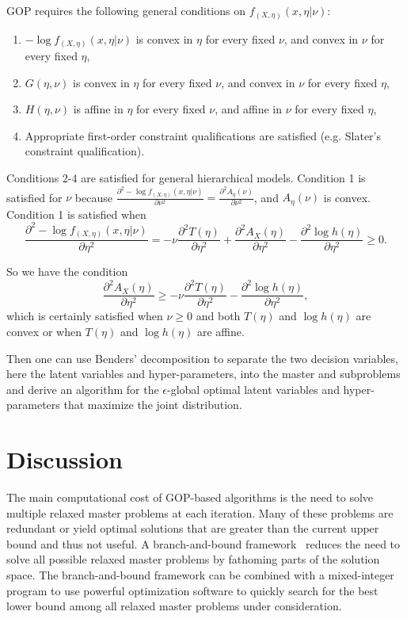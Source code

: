 \documentclass[11pt]{article}
\renewcommand{\geq}{\geqslant}
\begin{document}
GOP requires the following general conditions on $f_{(X,\eta)}(x, \eta | \nu)$:
\begin{enumerate}
	\item $-\log f_{(X,\eta)}(x, \eta | \nu)$ is convex in $\eta$ for every fixed $\nu$, and convex in $\nu$ for every fixed $\eta$,
	\item $G(\eta,\nu)$ is convex in $\eta$ for every fixed $\nu$, and convex in $\nu$ for every fixed $\eta$,
	\item $H(\eta, \nu)$ is affine in $\eta$ for every fixed $\nu$, and affine in $\nu$ for every fixed $\eta$,
	\item Appropriate first-order constraint qualifications are satisfied (e.g. Slater's constraint qualification).
\end{enumerate}

Conditions 2-4 are satisfied for general hierarchical models.
Condition 1 is satisfied for $\nu$ because $\frac{\partial^2 - \log f_{(X,\eta)}(x,\eta | \nu)}{\partial \nu^2} = \frac{\partial^2 A_\eta(\nu)}{\partial \nu^2}$, and $A_\eta(\nu)$ is convex. 
Condition 1 is satisfied when
%
\begin{equation}
	\frac{\partial^2 - \log f_{(X,\eta)}(x,\eta | \nu)}{\partial \eta^2} = -\nu \frac{\partial^2 T(\eta)}{\partial \eta^2} + \frac{\partial^2 A_X(\eta)}{\partial \eta^2} - \frac{\partial^2 \log h(\eta)}{\partial \eta^2} \geq 0.
\end{equation}

So we have the condition
%
\begin{equation}
	\frac{\partial^2 A_X(\eta)}{\partial \eta^2} \geq -\nu \frac{\partial^2 T(\eta)}{\partial \eta^2} - \frac{\partial^2 \log h(\eta)}{\partial \eta^2},
\end{equation}
%
which is certainly satisfied when $\nu \geq 0$ and both $T(\eta)$ and $\log h(\eta)$ are convex or when $T(\eta)$ and $\log h(\eta)$ are affine.

Then one can use Benders' decomposition to separate the two decision variables, here the latent variables and hyper-parameters, into the master and subproblems and derive an algorithm for the $\epsilon$-global optimal latent variables and hyper-parameters that maximize the joint distribution.


\section{Discussion}

The main computational cost of GOP-based algorithms is the need to solve multiple relaxed master problems at each iteration. 
Many of these problems are redundant or yield optimal solutions that are greater than the current upper bound and thus not useful. 
A branch-and-bound framework~\cite{Floudas1994} reduces the need to solve all possible relaxed master problems by fathoming parts of the solution space. 
The branch-and-bound framework can be combined with a mixed-integer program to use powerful optimization software to quickly search for the best lower bound among all relaxed master problems under consideration.
\end{document}
